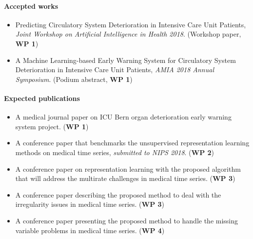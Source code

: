 
\paragraph{Accepted works}
\begin{itemize}
\item Predicting Circulatory System Deterioration in Intensive Care Unit Patients, \textit{Joint Workshop on Artificial Intelligence in Health 2018}. (Workshop paper, \textbf{WP 1})
\item A Machine Learning-based Early Warning System for Circulatory System Deterioration in Intensive Care Unit Patients, \textit{AMIA 2018 Annual Symposium}. (Podium abstract, \textbf{WP 1})
\end{itemize}
\paragraph{Expected publications}
\begin{itemize}
\item A medical journal paper on ICU Bern organ deterioration early warning system project. (\textbf{WP 1})
\item A conference paper that benchmarks the unsupervised representation learning methods on medical time series, \textit{submitted to NIPS 2018}. (\textbf{WP 2})
\item A conference paper on representation learning with the proposed algorithm that will address the multirate challenges in medical time series. (\textbf{WP 3})
\item A conference paper describing the proposed method to deal with the irregularity issues in medical time series. (\textbf{WP 3})
\item A conference paper presenting the proposed method to handle the missing variable problems in medical time series. (\textbf{WP 4})
\end{itemize}
